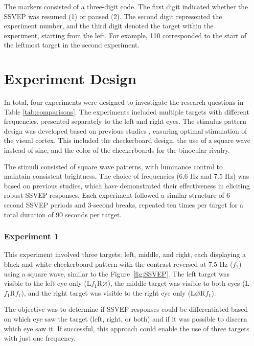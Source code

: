 The markers consisted of a three-digit code. The first digit indicated whether the SSVEP was resumed (1) or paused (2). The second digit represented the experiment number, and the third digit denoted the target within the experiment, starting from the left. For example, 110 corresponded to the start of the leftmost target in the second experiment.

\section{Experiment Design}
In total, four experiments were designed to investigate the research questions in Table \ref{tab:comparisons}. The experiments included multiple targets with different frequencies, presented separately to the left and right eyes. The stimulus pattern design was developed based on previous studies \cite{ZHANG2011362, DavidCarmel2010, yan2011right, hwang2013new, vialatte2010steadystate}, ensuring optimal stimulation of the visual cortex. This included the checkerboard design, the use of a square wave instead of sine, and the color of the checkerboards for the binocular rivalry. 

The stimuli consisted of square wave patterns, with luminance control to maintain consistent brightness. The choice of frequencies (6.6 Hz and 7.5 Hz) was based on previous studies, which have demonstrated their effectiveness in eliciting robust SSVEP responses. Each experiment followed a similar structure of 6-second SSVEP periods and 3-second breaks, repeated ten times per target for a total duration of 90 seconds per target. 


\subsubsection{Experiment 1}
This experiment involved three targets: left, middle, and right, each displaying a black and white checkerboard pattern with the contrast reversed at 7.5 Hz ($f_{1}$) using a square wave, similar to the Figure~\ref{fig:SSVEP}. The left target was visible to the left eye only (L$f_{1}$R$\varnothing$), the middle target was visible to both eyes (L$f_{1}$R$f_{1}$), and the right target was visible to the right eye only (L$\varnothing$R$f_{1}$). 

The objective was to determine if SSVEP responses could be differentiated based on which eye saw the target (left, right, or both) and if it was possible to discern which eye saw it. If successful, this approach could enable the use of three targets with just one frequency.


